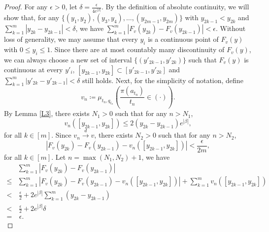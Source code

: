 \begin{proof}
For any $\epsilon > 0$, let $\delta = \frac{\epsilon}{4 e^{|\beta|}}$. By the definition of absolute continuity, we will show that, for any
$\{(y_1, y_2), (y_3, y_4), \dots, (y_{2m-1}, y_{2m})\}$ with $y_{2k-1} < y_{2k}$ and
$\sum_{k=1}^{m} |y_{2k} - y_{2k-1}| < \delta$, we have $\sum_{k=1}^{m} |F_v(y_{2k}) - F_v(y_{2k-1})| < \epsilon $.
Without loss of generality, we may assume that every $y_i$ is a continuous point of $F_v(y)$ with $0 \le y_i \le 1$. Since there are at most countably many discontinuity of $F_v(y)$, we can always choose a new set of interval $\{(y'_{2k-1}, y'_{2k})\}$  such that $F_v(y)$ is continuous at every $y'_i$,
$ [y_{2k-1}, y_{2k}] \subset [y'_{2k-1}, y'_{2k}]$ and $\sum_{k=1}^{m} |y'_{2k} - y'_{2k-1}| < \delta$ still holds. Next, for the simplicity of notation, define
\begin{equation}
v_n \coloneqq \mu_{t_n, q_{t_n}} \left( \frac{\pi(a_{t_n})}{t_n} \in ( \cdot ) \right). \label{eq:L4a}
\end{equation}
By Lemma \ref{L3}, there exists $N_1>0$ such that for any $n>N_1$,
\[
v_n \left( [y_{2k-1}, y_{2k}] \right) \le 2 (y_{2k}- y_{2k-1}) e^{|\beta|},
\]
for all $k \in [m]$. Since $v_n \overset{d}{\longrightarrow} v$, there exists
$N_2 >0$ such that for any $n>N_2$,
\[
\left|F_v(y_{2k}) - F_v(y_{2k-1}) - v_n \left( [y_{2k-1}, y_{2k}] \right) \right| < \frac{\epsilon}{2m},
\]
for all $k \in [m]$. Let $n = \max{(N_1, N_2)}+1$, we have
\begin{align*}
 &\sum_{k=1}^{m} |F_v(y_{2k}) - F_v(y_{2k-1})|\\
 \le& \sum_{k=1}^{m}\left|F_v(y_{2k}) - F_v(y_{2k-1})- v_n \left( [y_{2k-1}, y_{2k}] \right) \right| + \sum_{k=1}^{m} v_n \left( [y_{2k-1}, y_{2k}] \right)\\
 <&\, \frac{\epsilon}{2} + 2 e^{|\beta|} \sum_{k=1}^{m}(y_{2k} - y_{2k-1})\\
 <&\, \frac{\epsilon}{2} + 2 e^{|\beta|} \delta\\
 =&\  \epsilon.
\end{align*}
\end{proof}







